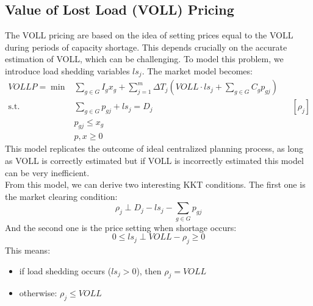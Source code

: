 \documentclass[12pt, openany]{report}
\theoremstyle{definition}
\begin{document}
\subsection{Value of Lost Load (VOLL) Pricing}
The VOLL pricing are based on the idea of setting prices equal to the VOLL during periods of capacity shortage. This depends crucially on the accurate estimation of VOLL, which can be challenging. To model this problem, we introduce load shedding variables $ls_j$. The market model becomes:
\begin{equation}
    \begin{aligned}
        VOLLP = \min &\sum_{g \in G} I_g x_g + \sum_{j=1}^m \Delta T_j (VOLL \cdot ls_j + \sum_{g\in G} C_g p_{gj}) &&\\
        \text{s.t. } &\sum_{g\in G} p_{gj} + ls_j = D_{j} && [\rho_j]\\
        &p_{gj} \leq x_g &&\\
        &p, x \geq 0
    \end{aligned}
\end{equation}
This model replicates the outcome of ideal centralized planning process, as long as VOLL is correctly estimated but if VOLL is incorrectly estimated this model can be very inefficient.\\
From this model, we can derive two interesting KKT conditions. The first one is the market clearing condition:
\begin{equation}
    \rho_j \perp D_j - ls_j - \sum_{g\in G}p_{gj}
\end{equation}
And the second one is the price setting when shortage occurs:
\begin{equation}
    0 \leq ls_j \perp VOLL - \rho_j \geq 0
\end{equation}
This means:
\begin{itemize}
    \item if load shedding occurs ($ls_j>0$), then $\rho_j=VOLL$
    \item otherwise: $\rho_j\le VOLL$
\end{itemize}
\end{document}
